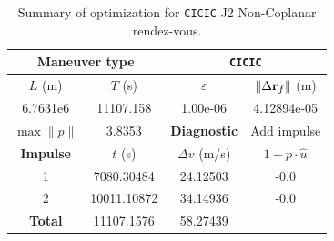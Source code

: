 \begin{table}[htpb]
    \centering
    \begin{tabular}{cccc} \toprule
    \multicolumn{2}{c}{\textbf{Maneuver type}} & \multicolumn{2}{c}{\texttt{CICIC}} \\ \midrule
    \(L\) (m) & \(T\) (s) & \(\varepsilon\) & \(\lVert \Delta \mathbf{r}_{f} \rVert\) (m)    \\ \midrule
    6.7631e6          & 11107.158          & 1.00e-06                & 4.12894e-05                        \\ \midrule
    \(\max \lVert p \rVert\) & 3.8353     & \textbf{Diagnostic}   & Add impulse        \\ \midrule
    \textbf{Impulse} & \(t\) (s) & \(\Delta v\) (m/s) & \(1 - p \cdot \hat{u}\) \\ \midrule
    1                 & 7080.30484          & 24.12503             & -0.0                    \\
    2                 & 10011.10872          & 34.14936             & -0.0                    \\\midrule
    \textbf{Total}   & 11107.1576          & 58.27439             &                     \\ \bottomrule   
    \end{tabular}
    \caption{Summary of optimization for \texttt{CICIC} J2 Non-Coplanar rendez-vous.}
    \label{tab:J2_nr_CICIC_tab}
\end{table}


